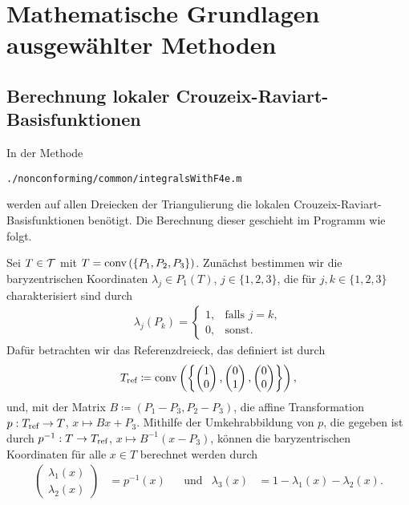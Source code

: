 \section{Mathematische Grundlagen ausgewählter Methoden}
\label{sec:mathematicalBasicsForMethods}


\subsection{Berechnung lokaler Crouzeix-Raviart-Basisfunktionen}
\label{sec:localCRBasisRealization}

In der Methode
\begin{center}
  \texttt{./nonconforming/common/integralsWithF4e.m}
\end{center}
werden auf allen Dreiecken der Triangulierung die lokalen
Crouzeix-Raviart-Basis\-funk\-tio\-nen benötigt. Die Berechnung dieser geschieht 
im Programm wie folgt.

Sei $T\in\mathcal{T}$ mit $T=\textup{conv}\left(\{P_1,P_2,P_3\}\right)$. Zunächst bestimmen
wir die baryzentrischen Koordinaten $\lambda_j\in P_1(T)$, $j\in\{1,2,3\}$,
die für $j,k\in\{1,2,3\}$ charakterisiert sind durch
\begin{align*}
  \lambda_j(P_k)
  =
  \begin{cases}
    1,&\text{falls }  j=k,\\
    0,&\text{sonst.}
  \end{cases}
\end{align*}
Dafür betrachten wir das Referenzdreieck, das 
definiert ist durch
\begin{align*}
  T_\textup{ref} \coloneqq
  \textup{conv}\left(\left\{
  \begin{pmatrix}
   1\\0 
  \end{pmatrix},
  \begin{pmatrix}
   0\\1 
  \end{pmatrix},
  \begin{pmatrix}
   0\\0 
  \end{pmatrix}
  \right\}\right),
\end{align*}
und, mit der Matrix $B\coloneqq (P_1-P_3,P_2-P_3)$, die affine Transformation
$p:T_\textup{ref} \to T$, $x \mapsto Bx+P_3$. 
Mithilfe der Umkehrabbildung von $p$, die gegeben ist durch $p^{-1}:T\to T_\textup{ref}$,
$x\mapsto B^{-1}(x-P_3)$, können die baryzentrischen Koordinaten für alle $x\in
T$ berechnet werden durch 
\begin{align*}
  \begin{pmatrix}
    \lambda_1(x)\\
    \lambda_2(x)
  \end{pmatrix}
  &=
  p^{-1}(x) &&\text{und}
  &\lambda_3(x)
  &=1-\lambda_1(x)-\lambda_2(x).
\end{align*}

